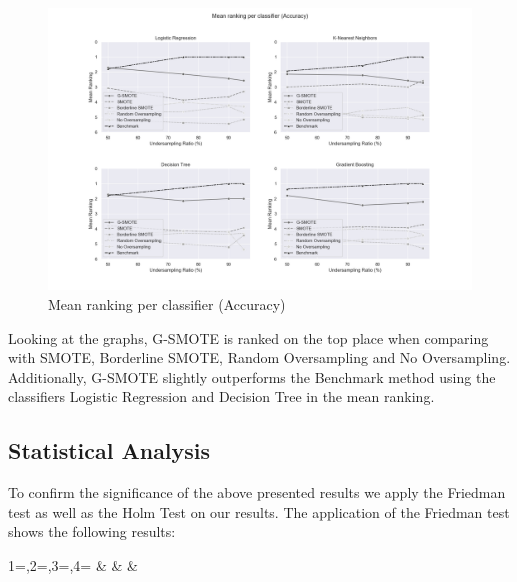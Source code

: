 \documentclass[parskip=full]{scrartcl}
\begin{document}
\begin{figure}[H]
	\includegraphics[width=1\linewidth]
		{../analysis/mean_ranking_per_classifier_accuracy}
	\caption{Mean ranking per classifier (Accuracy)}
	\label{fig:mean_ranking_per_classifier_accuracy}
\end{figure}

Looking at the graphs, G-SMOTE is ranked on the top place when comparing with 
SMOTE, Borderline SMOTE, Random Oversampling and No Oversampling. Additionally, 
G-SMOTE slightly outperforms the Benchmark method using the classifiers 
Logistic Regression and Decision Tree in the mean ranking. 

\subsection{Statistical Analysis}

To confirm the significance of the above presented results we apply the 
Friedman test as well as the Holm Test on our results. The application of the 
Friedman test shows the following results:

\begin{center}
	\begin{footnotesize}
		{1=\classifier,2=\metric,3=\pvalue,4=\significance}
		{\classifier & \metric & \pvalue & \significance}
	\end{footnotesize}
	\addtocounter{table}{-1}
	\label{tab:friedman_test}
\end{center}
\end{document}
